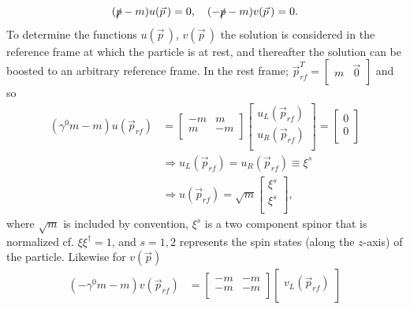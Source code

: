 \begin{enumerate}
\begin{equation}
	(\slashed p-m)u(\vec{p}\,)=0, \quad (-\slashed p-m)v(\vec{p}\,)=0.
	\label{orse}
\end{equation} 
To determine the functions $u(\vec{p}\,)$, $v(\vec{p}\,)$ the solution is considered in the reference frame at which the particle is at rest, and thereafter the solution can be boosted to an arbitrary reference frame. In the rest frame; $\vec{p}_{rf}^T=\begin{bmatrix}
m &
\vec{0}\\
\end{bmatrix}$ and so
\begin{equation}
	\begin{split}
		(\gamma^0 m -m)u(\vec{p}_{rf})&=\begin{bmatrix}
			-m & m \\
			m & -m \\
		\end{bmatrix}\begin{bmatrix}
		u_L(\vec{p}_{rf})\\
		u_R(\vec{p}_{rf})\\
	\end{bmatrix}=\begin{bmatrix}
	0\\
	0\\
\end{bmatrix}\\
&\Rightarrow u_L(\vec{p}_{rf})=u_R(\vec{p}_{rf})\equiv\xi^s\\
&\Rightarrow u(\vec{p}_{rf})=\sqrt{m}\begin{bmatrix}
	\xi^s\\
	\xi^s\\
\end{bmatrix},
\end{split}
\end{equation} 
where $\sqrt{m}$ is included by convention, $\xi^s$ is a two component spinor that is normalized cf. $\xi\xi^\dagger=1$, and $s=1,2$ represents the spin states (along the $z$-axis) of the particle. Likewise for $v(\vec{p})$
\begin{equation}
	\begin{split}
		(-\gamma^0 m -m)v(\vec{p}_{rf})&=\begin{bmatrix}
			-m & -m \\
			-m & -m \\
		\end{bmatrix}\begin{bmatrix}
		v_L(\vec{p}_{rf})\\

\end{bmatrix}
\end{split}
\end{equation}
\end{enumerate}

